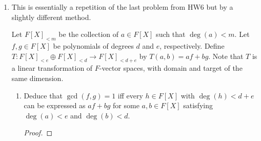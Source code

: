 \documentclass[../psets.tex]{subfiles}
\begin{document}
\begin{enumerate}
\begin{enumerate}
\begin{proof}




            Consider the ring homomorphism $\ev_a:F[X]\to E$. More specifically, consider $\ker(\ev_a)$. Since $F[X]$ is a PID and kernels are ideals, we know that $\ker(\ev_a)=(g)$ for some $g\in F[X]$. Since $a$ is a repeated root of $f$, part (i) implies that $f(a)=f'(a)=0$. Thus, $f,f'\in\ker(\ev_a)=(g)$, so both $f$ and $f'$ are multiples of $g$. Additionally, we know that $\deg(g)>0$ since the only constant polynomial that "maps" $a$ to 0 is the zero polynomial, and $f$ nonzero an element of $(g)$ implies that 0 is not the generator of the kernel.
        \end{proof}
    \end{enumerate}
    \item This is essentially a repetition of the last problem from HW6 but by a slightly different method.\par
    Let $F[X]_{<m}$ be the collection of $a\in F[X]$ such that $\deg(a)<m$. Let $f,g\in F[X]$ be polynomials of degrees $d$ and $e$, respectively. Define $T:F[X]_{<e}\oplus F[X]_{<d}\to F[X]_{<d+e}$ by $T(a,b)=af+bg$. Note that $T$ is a linear transformation of $F$-vector spaces, with domain and target of the same dimension.
    \begin{enumerate}
        \item Deduce that $\gcd(f,g)=1$ iff every $h\in F[X]$ with $\deg(h)<d+e$ can be expressed as $af+bg$ for some $a,b\in F[X]$ satisfying $\deg(a)<e$ and $\deg(b)<d$.
        \begin{proof}
            


\end{proof}
\end{enumerate}
\end{enumerate}
\end{document}
